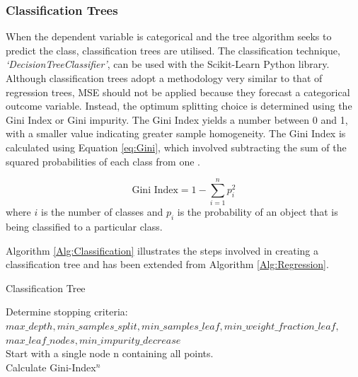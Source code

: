\documentclass[../thesis.tex]{subfiles}
\begin{document}
\subsubsection{Classification Trees}
When the dependent variable is categorical and the tree algorithm seeks to predict the class, classification trees are utilised. The classification technique, \textit{`DecisionTreeClassifier'}, can be used with the Scikit-Learn \cite{Pedregosa2011} Python library. Although classification trees adopt a methodology very similar to that of regression trees, MSE should not be applied because they forecast a categorical outcome variable. Instead, the optimum splitting choice is determined using the Gini Index or Gini impurity. The Gini Index yields a number between 0 and 1, with a smaller value indicating greater sample homogeneity. The Gini Index is calculated using Equation \eqref{eq:Gini}, which involved subtracting the sum of the squared probabilities of each class from one \cite{Das2020}.

\begin{equation}\label{eq:Gini}
    \text{Gini Index} = 1 - \sum_{i=1}^{n}p_{i}^{2}
\end{equation}
where $i$ is the number of classes and $p_{i}$ is the probability of an object that is being classified to a particular class.

Algorithm \ref{Alg:Classification} illustrates the steps involved in creating a classification tree and has been extended from Algorithm \ref{Alg:Regression}.
\begin{algorithm}
\caption{Classification Tree}\label{Alg:Classification}
Determine stopping criteria:\\ $max\_depth, min\_samples\_split, min\_samples\_leaf, min\_weight\_fraction\_leaf,$\\$ max\_leaf\_nodes, min\_impurity\_decrease$\\
Start with a single node n containing all points. \\
Calculate Gini-Index$^{n}$\\
\end{algorithm}
\end{document}
